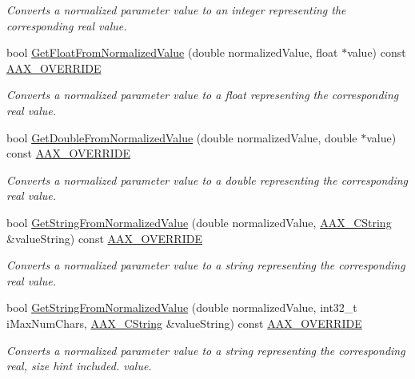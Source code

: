 \begin{Indent}
\begin{DoxyCompactItemize}
\begin{DoxyCompactList}\small\item\em Converts a normalized parameter value to an integer representing the corresponding real value. \end{DoxyCompactList}\item 
bool \mbox{\hyperlink{a01537_ae4d87c067f3b5ac290fda64d36d2bab7}{Get\+Float\+From\+Normalized\+Value}} (double normalized\+Value, float $\ast$value) const \mbox{\hyperlink{a00392_ac2f24a5172689ae684344abdcce55463}{A\+A\+X\+\_\+\+O\+V\+E\+R\+R\+I\+DE}}
\begin{DoxyCompactList}\small\item\em Converts a normalized parameter value to a float representing the corresponding real value. \end{DoxyCompactList}\item 
bool \mbox{\hyperlink{a01537_aab66e9fc07a5593e5353014c9b5801eb}{Get\+Double\+From\+Normalized\+Value}} (double normalized\+Value, double $\ast$value) const \mbox{\hyperlink{a00392_ac2f24a5172689ae684344abdcce55463}{A\+A\+X\+\_\+\+O\+V\+E\+R\+R\+I\+DE}}
\begin{DoxyCompactList}\small\item\em Converts a normalized parameter value to a double representing the corresponding real value. \end{DoxyCompactList}\item 
bool \mbox{\hyperlink{a01537_ae29f9d2663b8813e47abccecd8d9a606}{Get\+String\+From\+Normalized\+Value}} (double normalized\+Value, \mbox{\hyperlink{a01573}{A\+A\+X\+\_\+\+C\+String}} \&value\+String) const \mbox{\hyperlink{a00392_ac2f24a5172689ae684344abdcce55463}{A\+A\+X\+\_\+\+O\+V\+E\+R\+R\+I\+DE}}
\begin{DoxyCompactList}\small\item\em Converts a normalized parameter value to a string representing the corresponding real value. \end{DoxyCompactList}\item 
bool \mbox{\hyperlink{a01537_a16409f9cf67b4b01172fe2090d258c82}{Get\+String\+From\+Normalized\+Value}} (double normalized\+Value, int32\+\_\+t i\+Max\+Num\+Chars, \mbox{\hyperlink{a01573}{A\+A\+X\+\_\+\+C\+String}} \&value\+String) const \mbox{\hyperlink{a00392_ac2f24a5172689ae684344abdcce55463}{A\+A\+X\+\_\+\+O\+V\+E\+R\+R\+I\+DE}}
\begin{DoxyCompactList}\small\item\em Converts a normalized parameter value to a string representing the corresponding real, size hint included. value. \end{DoxyCompactList}\item 

\end{DoxyCompactItemize}
\end{Indent}
